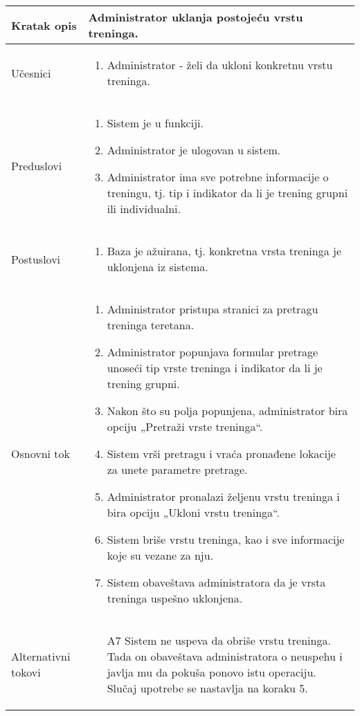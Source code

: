 \documentclass[../main.tex]{subfiles}
\begin{document}
\begin{longtable}{| p{} | p{} |} 

\hline
    Kratak opis &  Administrator uklanja postojeću vrstu treninga.\\ 
\hline    
    Učesnici & 
    	\begin{enumerate}
        \item Administrator - želi da ukloni konkretnu vrstu treninga.
     \end{enumerate}\\
\hline
   Preduslovi & \begin{enumerate}
       \item Sistem je u funkciji.
       \item Administrator je ulogovan u sistem.
       \item Administrator ima sve potrebne informacije o treningu, tj. tip i indikator da li je trening grupni ili individualni.
   \end{enumerate}\\
\hline  
    Postuslovi & \begin{enumerate}
        \item Baza je ažuirana, tj. konkretna vrsta treninga je uklonjena iz sistema.
    \end{enumerate}\\
\hline
    Osnovni tok & \begin{enumerate}
        \item Administrator pristupa stranici za pretragu treninga teretana.
        \item Administrator popunjava formular pretrage unoseći tip vrste treninga i indikator da li je trening grupni.
        \item Nakon što su polja popunjena, administrator bira opciju „Pretraži vrste treninga“.
        \item Sistem vrši pretragu i vraća pronađene lokacije za unete parametre pretrage.
        \item Administrator pronalazi željenu vrstu treninga i bira opciju „Ukloni vrstu treninga“.
        \item Sistem briše vrstu treninga, kao i sve informacije koje su vezane za nju.
        \item Sistem obaveštava administratora da je vrsta treninga uspešno uklonjena.
    \end{enumerate}\\
\hline
    Alternativni tokovi & \begin{itemize}
        \item[A7]  Sistem ne uspeva da obriše vrstu treninga. Tada on obaveštava administratora o neuspehu i javlja mu da pokuša ponovo istu operaciju. Slučaj upotrebe se nastavlja na koraku 5.


\end{itemize}
\end{longtable}
\end{document}

